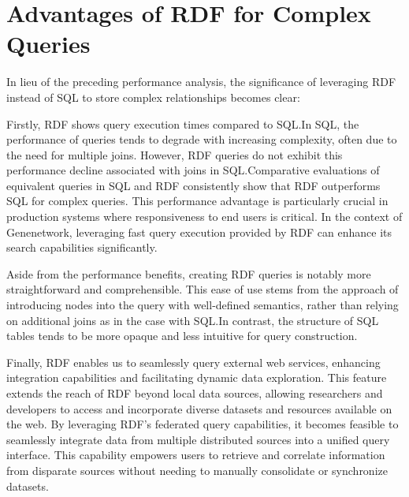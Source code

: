 \section{Advantages of RDF for Complex Queries}

In lieu of the preceding performance analysis, the significance of leveraging RDF instead of SQL to store complex relationships becomes clear:

Firstly, RDF shows query execution times compared to SQL.\@  In SQL, the performance of queries tends to degrade with increasing complexity, often due to the need for multiple joins.  However, RDF queries do not exhibit this performance decline associated with joins in SQL.\@  Comparative evaluations of equivalent queries in SQL and RDF consistently show that RDF outperforms SQL for complex queries.  This performance advantage is particularly crucial in production systems where responsiveness to end users is critical.  In the context of Genenetwork, leveraging fast query execution provided by RDF can enhance its search capabilities significantly.

Aside from the performance benefits, creating RDF queries is notably more straightforward and comprehensible.  This ease of use stems from the approach of introducing nodes into the query with well-defined semantics, rather than relying on additional joins as in the case with SQL.\@  In contrast, the structure of SQL tables tends to be more opaque and less intuitive for query construction.


Finally, RDF enables us to seamlessly query external web services, enhancing integration capabilities and facilitating dynamic data exploration.  This feature extends the reach of RDF beyond local data sources, allowing researchers and developers to access and incorporate diverse datasets and resources available on the web.  By leveraging RDF's federated query capabilities, it becomes feasible to seamlessly integrate data from multiple distributed sources into a unified query interface.  This capability empowers users to retrieve and correlate information from disparate sources without needing to manually consolidate or synchronize datasets.

